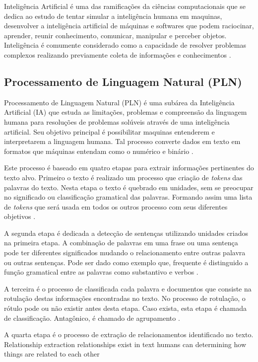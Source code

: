 Inteligência Artificial é uma das ramificações da ciências computacionais que se dedica ao estudo de tentar simular a inteligência humana em maquinas, desenvolver a inteligência artificial de máquinas e softwares que podem raciocinar, aprender, reunir conhecimento, comunicar, manipular e perceber objetos. Inteligência é comumente considerado como a capacidade de resolver problemas complexos realizando previamente coleta de informações e conhecimentos \cite{Pannu:2015}.

\noindent {}

\subsection{Processamento de Linguagem Natural (PLN)} Processamento de Linguagem Natural (PLN) é uma subárea da Inteligência Artificial (IA) que estuda as limitações, problemas e compreensão da linguagem humana para resoluções de problemas solúveis através de uma inteligência artificial.  Seu objetivo principal é possibilitar maquinas entenderem e interpretarem a linguagem humana. Tal processo converte dados em texto em formatos que máquinas entendam como o numérico e binário \cite{Kulkarni:2019}.

Este processo é baseado em quatro etapas para extrair informações pertinentes do texto alvo. Primeiro o texto é realizado um processo que criação de \textit{tokens} das palavras do texto. Nesta etapa o texto é quebrado em unidades, sem se preocupar no significado ou classificação gramatical das palavras. Formando assim uma lista de \textit{tokens} que será usada em todos os outros processo com seus diferentes objetivos \cite{Reese:2015}.

A segunda etapa é dedicada a detecção de sentenças utilizando unidades criados na primeira etapa. A combinação de palavras em uma frase ou uma sentença pode ter diferentes significados mudando o relacionamento entre outras palavra ou outras sentenças. Pode ser dado como exemplo que, frequente é distinguido a função gramatical entre as palavras como substantivo e verbos \cite{Reese:2015}.

A terceira é o processo de classificada cada palavra e documentos que consiste na rotulação destas informações encontradas no texto. No processo de rotulação, o rótulo pode ou não existir antes desta etapa. Caso exista, esta etapa é chamada de classificação. Antagônico, é chamado de agrupamento \cite{Reese:2015}.

A quarta etapa é o processo de extração de relacionamentos identificado no texto.
Relationship extraction
relationships exist in text
humans can determining how things are related to each other
